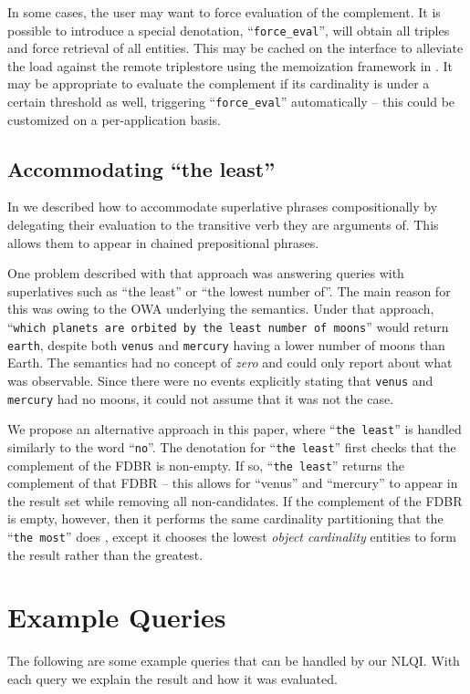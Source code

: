 \documentclass[../main.tex]{subfiles}
\begin{document}
\begin{refsection}
In some cases, the user may want to force evaluation of the complement.  It is possible to introduce a special denotation, ``\texttt{force\_eval}'', will obtain all triples and force retrieval of all entities.  This may be cached on the interface to alleviate the load against the remote triplestore using the memoization framework in \cite{frostpeelar2019}.  It may be appropriate to evaluate the complement if its cardinality is under a certain threshold as well, triggering ``\texttt{force\_eval}'' automatically -- this could be customized on a per-application basis.

\subsection{Accommodating ``the least''} %

In \cite{frostpeelar2019} we described how to accommodate superlative phrases compositionally by
delegating their evaluation to the transitive verb they are arguments of.  This allows them to appear in chained prepositional phrases.

One problem described with that approach was answering queries with superlatives such as ``the least'' or ``the lowest number of''.  The main reason for this was owing to the OWA underlying the semantics.  Under that approach, ``\texttt{which planets are orbited by the least number of moons}'' would return \texttt{earth}, despite both \texttt{venus} and \texttt{mercury} having a lower number of moons than Earth.  The semantics had no concept of \textit{zero} and could only report about what was observable.  Since there were no events explicitly stating that \texttt{venus} and \texttt{mercury} had no moons, it could not assume that it was not the case.

We propose an alternative approach in this paper, where ``\texttt{the least}'' is handled similarly to the word ``\texttt{no}''.  The denotation for ``\texttt{the least}'' first checks that the complement of the FDBR is non-empty.  If so, ``\texttt{the least}'' returns the complement of that FDBR -- this allows for ``venus'' and ``mercury'' to appear in the result set while removing all non-candidates.  If the complement of the FDBR is empty, however, then it performs the same cardinality partitioning that the ``\texttt{the most}'' does \cite{frostpeelar2019}, except it chooses the lowest {\em object cardinality} entities to form the result rather than the greatest.

\section{Example Queries}
\label{webist2020conf:examples}
\noindent The following are some example queries that can be handled by our NLQI.  With each query
we explain the result and how it was evaluated.


\end{refsection}
\end{document}

